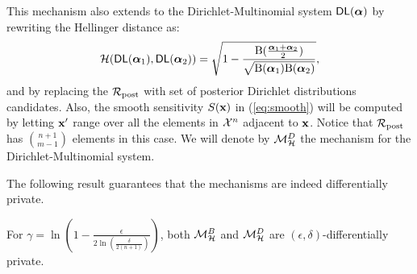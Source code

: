 \documentclass[sigconf, anonymous]{acmart}
\begin{document}
This mechanism also extends to the Dirichlet-Multinomial system $\mathsf{DL}(\boldsymbol{\alpha})$ by rewriting the Hellinger distance as:
\[
  \mathcal{H}(\mathsf{DL}(\boldsymbol{\alpha}_1), \mathsf{DL}(\boldsymbol{\alpha}_2)) = \sqrt{1 - \frac{\textup{B}(\frac{\boldsymbol{\alpha}_1 + \boldsymbol{\alpha}_2}{2})}{\sqrt{\textup{B}(\boldsymbol{\alpha}_1) \textup{B}(\boldsymbol{\alpha}_2)}}},
\]
and by replacing the $\mathcal{R}_{\textup{post}}$ with set of posterior Dirichlet distributions candidates. Also, the smooth sensitivity $S(\textbf{x})$ in (\ref{eq:smooth}) will be
computed by letting $\textbf{x}'$ range over all the elements in $\mathcal{X}^{n}$ adjacent to $\textbf{x}$.
Notice that $\mathcal{R}_{\textup{post}}$ has $\binom{n + 1}{m - 1}$ elements in this case. We will denote by
$\mathcal{M}^{D}_{\mathcal{H}}$ the mechanism for the Dirichlet-Multinomial system.

The following result guarantees that the mechanisms are indeed differentially private.

\begin{theorem}[Privacy] 
  For  $\gamma=\ln(1 - \frac{\epsilon}{2 \ln (\frac{\delta}{2 (n + 1)})})$, both
  $\mathcal{M}^{B}_{\mathcal{H}}$ and $\mathcal{M}^{D}_{\mathcal{H}}$ are $(\epsilon,\delta)$-differentially private.
\end{theorem}
\end{document}
